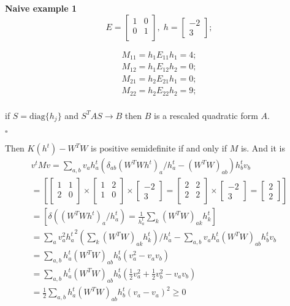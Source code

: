 \documentclass{extreport}
\begin{document}
\textbf{Naive example 1}
\[
  E =
  \begin{bmatrix}
    1 & 0 \\
    0 & 1 \\
  \end{bmatrix}, \;
  h = \begin{bmatrix} -2 \\ 3 \end{bmatrix};
\]

\begin{align*}
  M_{11} = h_1 E_{11} h_1 = 4; \\
  M_{12} = h_1 E_{12} h_2 = 0; \\
  M_{21} = h_2 E_{21} h_1 = 0; \\
  M_{22} = h_2 E_{22} h_2 = 9; \\
\end{align*}

if $ S = \text{diag}\{h_j\}$ and $S^T A S \rightarrow B$
then $B$ is a rescaled quadratic form $A$.

$\square$

Then $K(h^t) - W^TW$ is positive semidefinite if and only if $M$ is.
And it is
\begin{multline}
  v^t M v =
  \sum_{a,b}v_a h_a^t (\delta_{ab}(W^TWh^t)_a / h_a^t
  -(W^TW)_{ab})h_b^t v_b \\
  =
  \left[
    \begin{bmatrix}1 & 1 \\ 2 & 0 \\ \end{bmatrix} \times
    \begin{bmatrix}1 & 2 \\ 1 & 0 \\ \end{bmatrix} \times
    \begin{bmatrix} -2 \\ 3 \end{bmatrix}
    =
      \begin{bmatrix}2 & 2 \\ 2 & 2 \\ \end{bmatrix} \times
      \begin{bmatrix} -2 \\ 3 \end{bmatrix} =
      \begin{bmatrix} 2 \\ 2 \end{bmatrix}
  \right] \\
  =
  \left[
    \delta((W^TWh^t)_a / h_a^t) =
    \frac{1}{h_a^t} \sum_k (W^TW)_{ak} h_k^t
  \right] \\
  =
  \sum_a v_a^2 {h_a^t}^2
    \left(\sum_k(W^TW)_{ak}h_k^t\right) /h_a^t -
    \sum_{a,b} v_ah_a^t(W^TW)_{ab}h_b^tv_b \\
  = \sum_{a,b}h_a^t(W^TW)_{ab}h_b^t(v_a^2 - v_av_b) \\
  = \sum_{a,b}h_a^t(W^TW)_{ab}h_b^t(
    \frac{1}{2}v_a^2 + \frac{1}{2}v_b^2 - v_av_b) \\
  = \frac{1}{2} \sum_{a,b}h_a^t(W^TW)_{ab}h_b^t(v_a - v_a)^2 \geqslant 0 \\
\end{multline}
\end{document}
